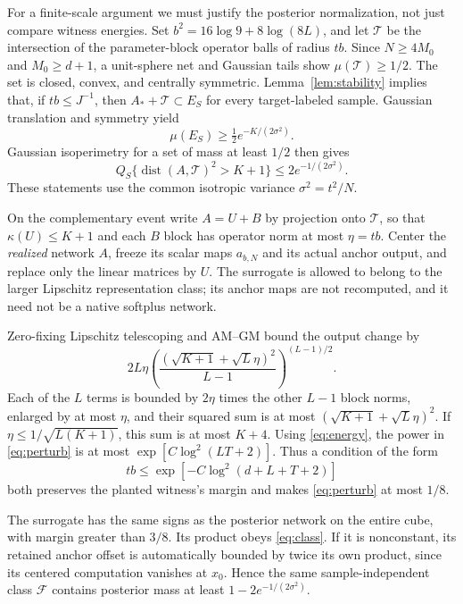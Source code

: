 \documentclass[11pt]{article}
\theoremstyle{remark}\newtheorem{remark}[theorem]{Remark}
\begin{document}
For a finite-scale argument we must justify the posterior normalization,
not just compare witness energies. Set
$b^2=16\log9+8\log(8L)$, and let $\mathcal T$ be the intersection of
the parameter-block operator balls of radius $tb$. Since $N\ge4M_0$
and $M_0\ge d+1$, a unit-sphere net and Gaussian tails show
$\mu(\mathcal T)\ge1/2$. The set is closed, convex, and centrally
symmetric. Lemma~\ref{lem:stability} implies that, if $tb\le J^{-1}$,
then $A_*+\mathcal T\subset E_S$ for every target-labeled sample.
Gaussian translation and symmetry yield
\[
 \mu(E_S)\ge\tfrac12e^{-K/(2\sigma^2)}.
\]
Gaussian isoperimetry for a set of mass at least $1/2$ then gives
\begin{equation}\label{eq:distance}
 Q_S\{\operatorname{dist}(A,\mathcal T)^2>K+1\}
 \le2e^{-1/(2\sigma^2)}.
\end{equation}
These statements use the common isotropic variance $\sigma^2=t^2/N$.

On the complementary event write $A=U+B$ by projection onto $\mathcal T$,
so that $\kappa(U)\le K+1$ and each $B$ block has operator norm at most
$\eta=tb$. Center the \emph{realized} network $A$, freeze its scalar
maps $a_{b,N}$ and its actual anchor output, and replace only the linear
matrices by $U$. The surrogate is allowed to belong to the larger
Lipschitz representation class; its anchor maps are not recomputed, and
it need not be a native softplus network.

Zero-fixing Lipschitz telescoping and AM--GM bound the output change by
\begin{equation}\label{eq:perturb}
 2L\eta
 \left(\frac{(\sqrt{K+1}+\sqrt L\eta)^2}{L-1}\right)^{(L-1)/2}.
\end{equation}
Each of the $L$ terms is bounded by $2\eta$ times the other $L-1$
block norms, enlarged by at most $\eta$, and their squared sum is at
most $(\sqrt{K+1}+\sqrt L\eta)^2$. If
$\eta\le1/\sqrt{L(K+1)}$, this sum is at most $K+4$. Using
\eqref{eq:energy}, the power in \eqref{eq:perturb} is at most
$\exp[C\log^2(LT+2)]$. Thus a condition of the form
\begin{equation}\label{eq:small}
 tb\le\exp[-C\log^2(d+L+T+2)]
\end{equation}
both preserves the planted witness's margin and makes
\eqref{eq:perturb} at most $1/8$.

The surrogate has the same signs as the posterior network on the entire
cube, with margin greater than $3/8$. Its product obeys \eqref{eq:class}.
If it is nonconstant, its retained anchor offset is automatically bounded
by twice its own product, since its centered computation vanishes at
$x_0$. Hence the same sample-independent class $\mathcal F$ contains
posterior mass at least $1-2e^{-1/(2\sigma^2)}$.
\end{document}
